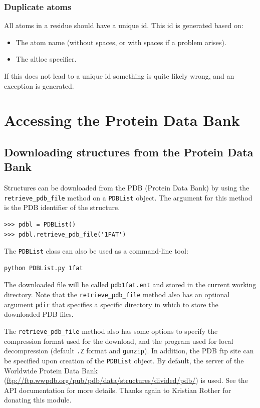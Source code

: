 \documentclass{report}
\begin{document}
\subsubsection{Duplicate atoms}

All atoms in a residue should have a unique id. This id is generated based on:

\begin{itemize}
\item The atom name (without spaces, or with spaces if a problem arises).
\item The altloc specifier.
\end{itemize}
If this does not lead to a unique id something is quite likely wrong, and an
exception is generated.

\section{Accessing the Protein Data Bank}

\subsection{Downloading structures from the Protein Data Bank}

Structures can be downloaded from the PDB (Protein Data Bank)
by using the \texttt{retrieve\_pdb\_file} method on a \texttt{PDBList} object.
The argument for this method is the PDB identifier of the structure.

\begin{verbatim}
>>> pdbl = PDBList()
>>> pdbl.retrieve_pdb_file('1FAT')
\end{verbatim}

The \texttt{PDBList} class can also be used as a command-line tool: 
\begin{verbatim}
python PDBList.py 1fat
\end{verbatim}
The downloaded file will be called \texttt{pdb1fat.ent} and stored
in the current working directory. Note that the \texttt{retrieve\_pdb\_file}
method also has an optional argument \texttt{pdir} that specifies
a specific directory in which to store the downloaded PDB files. 

The \texttt{retrieve\_pdb\_file} method also has some options to specify
the compression format used for the download, and the program used
for local decompression (default \texttt{.Z} format and \texttt{gunzip}).
In addition, the PDB ftp site can be specified upon creation of the
\texttt{PDBList} object. By default, the server of the Worldwide Protein Data Bank (\url{ftp://ftp.wwpdb.org/pub/pdb/data/structures/divided/pdb/})
is used. See the API documentation for more details. Thanks again
to Kristian Rother for donating this module.
\end{document}
